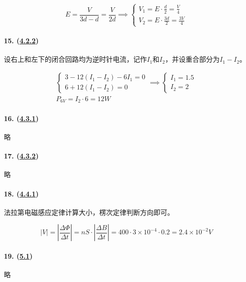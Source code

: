 \begin{equation*}
    E=\frac{V}{3d-d}=\frac{V}{2d}\implies
    \begin{cases}
        V_1=E\cdot\frac{d}{2}=\frac{V}{4}\\
        V_2=E\cdot\frac{3d}{2}=\frac{3V}{4}
    \end{cases}
\end{equation*}

\paragraph{15. (\hyperref[subsec:4.2.2]{4.2.2})} 设右上和左下的闭合回路均为逆时针电流，记作$I_1$和$I_2$，并设重合部分为$I_1-I_2$。

\begin{gather*}
    \begin{cases}
        3-12(I_1-I_2)-6I_1=0\\
        6+12(I_1-I_2)=0
    \end{cases}\implies
    \begin{cases}
        I_1=1.5\\
        I_2=2
    \end{cases}\\
    P_{6V}=I_2\cdot6=12W
\end{gather*}

\paragraph{16. (\hyperref[subsec:4.3.1]{4.3.1})} 略
\paragraph{17. (\hyperref[subsec:4.3.2]{4.3.2})} 略
\paragraph{18. (\hyperref[subsec:4.4.1]{4.4.1})} 法拉第电磁感应定律计算大小，楞次定律判断方向即可。

\begin{equation*}
    |V|=\left|\frac{\Delta\Phi}{\Delta t}\right|
    =nS\cdot\left|\frac{\Delta B}{\Delta t}\right|
    =400\cdot3\times10^{-4}\cdot0.2=2.4\times10^{-2}V
\end{equation*}

\paragraph{19. (\hyperref[sec:5.1]{5.1})} 略
